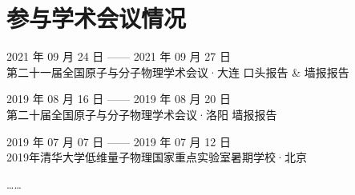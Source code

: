 \section*{参与学术会议情况} %




\begin{enumerate}[label = {[\arabic*]}]
    \addtolength{\itemsep}{-.36\baselineskip}%
    \item 2021 年 09 月 24 日  —— 2021 年 09 月 27 日 \\ 第二十一届全国原子与分子物理学术会议·大连 \quad 口头报告 \& 墙报报告
    \item 2019 年 08 月 16 日  —— 2019 年 08 月 20 日 \\ 第二十届全国原子与分子物理学术会议·洛阳 \quad 墙报报告
    \item 2019 年 07 月 07 日  —— 2019 年 07 月 12 日 \\ 2019年清华大学低维量子物理国家重点实验室暑期学校·北京 
    \item ……
\end{enumerate}



























